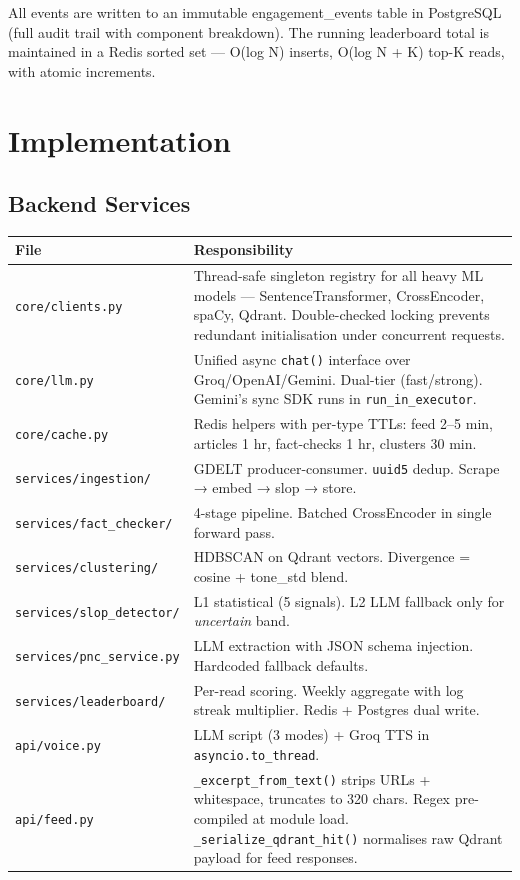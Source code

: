 \documentclass[9pt,a4paper,twocolumn]{article}
\newcommand{\code}[1]{{\ttfamily\small\color{steel}#1}}
\begin{document}
All events are written to an immutable \code{engagement\_events} table in PostgreSQL (full audit trail with component breakdown). The running leaderboard total is maintained in a Redis sorted set — O(log N) inserts, O(log N + K) top-K reads, with atomic increments.

\section{Implementation}

\subsection{Backend Services}

\begin{center}
\small
\begin{tabularx}{\columnwidth}{@{}lX@{}}
\toprule
\textbf{File} & \textbf{Responsibility} \\
\midrule
\texttt{core/clients.py}       & Thread-safe singleton registry for all heavy ML models — SentenceTransformer, CrossEncoder, spaCy, Qdrant. Double-checked locking prevents redundant initialisation under concurrent requests. \\
\texttt{core/llm.py}           & Unified async \texttt{chat()} interface over Groq/OpenAI/Gemini. Dual-tier (fast/strong). Gemini's sync SDK runs in \texttt{run\_in\_executor}. \\
\texttt{core/cache.py}         & Redis helpers with per-type TTLs: feed 2–5 min, articles 1 hr, fact-checks 1 hr, clusters 30 min. \\
\texttt{services/ingestion/}   & GDELT producer-consumer. \texttt{uuid5} dedup. Scrape → embed → slop → store. \\
\texttt{services/fact\_checker/} & 4-stage pipeline. Batched CrossEncoder in single forward pass. \\
\texttt{services/clustering/}  & HDBSCAN on Qdrant vectors. Divergence = cosine + tone\_std blend. \\
\texttt{services/slop\_detector/} & L1 statistical (5 signals). L2 LLM fallback only for \textit{uncertain} band. \\
\texttt{services/pnc\_service.py} & LLM extraction with JSON schema injection. Hardcoded fallback defaults. \\
\texttt{services/leaderboard/} & Per-read scoring. Weekly aggregate with log streak multiplier. Redis + Postgres dual write. \\
\texttt{api/voice.py}          & LLM script (3 modes) + Groq TTS in \texttt{asyncio.to\_thread}. \\
\texttt{api/feed.py}           & \texttt{\_excerpt\_from\_text()} strips URLs + whitespace, truncates to 320 chars. Regex pre-compiled at module load. \texttt{\_serialize\_qdrant\_hit()} normalises raw Qdrant payload for feed responses. \\
\bottomrule
\end{tabularx}
\end{center}
\end{document}
